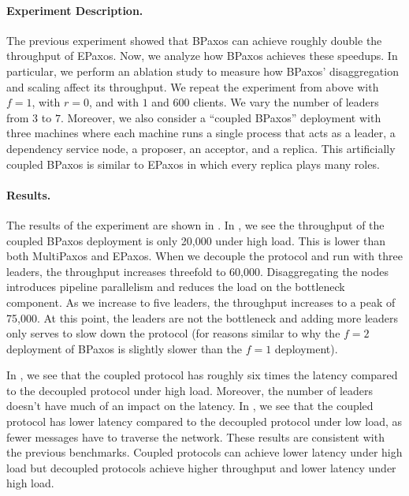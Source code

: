 \paragraph{Experiment Description.}
The previous experiment showed that BPaxos can achieve roughly double the
throughput of EPaxos. Now, we analyze how BPaxos achieves these speedups. In
particular, we perform an ablation study to measure how BPaxos' disaggregation
and scaling affect its throughput. We repeat the experiment from above with
$f=1$, with $r=0$, and with $1$ and $600$ clients. We vary the number of
leaders from $3$ to $7$. Moreover, we also consider a ``coupled BPaxos''
deployment with three machines where each machine runs a single process that
acts as a leader, a dependency service node, a proposer, an acceptor, and a
replica. This artificially coupled BPaxos is similar to EPaxos in which every
replica plays many roles.


\paragraph{Results.}
The results of the experiment are shown in . In
, we see the throughput of the coupled
BPaxos deployment is only 20,000 under high load. This is lower than both
MultiPaxos and EPaxos. When we decouple the protocol and run with three
leaders, the throughput increases threefold to 60,000. Disaggregating the nodes
introduces pipeline parallelism and reduces the load on the bottleneck
component. As we increase to five leaders, the throughput increases to a peak
of 75,000. At this point, the leaders are not the bottleneck and adding more
leaders only serves to slow down the protocol (for reasons similar to why the
$f=2$ deployment of BPaxos is slightly slower than the $f=1$ deployment).

In , we see that the coupled protocol has
roughly six times the latency compared to the decoupled protocol under high
load. Moreover, the number of leaders doesn't have much of an impact on the
latency. In , we see that the coupled
protocol has lower latency compared to the decoupled protocol under low load,
as fewer messages have to traverse the network. These results are consistent
with the previous benchmarks. Coupled protocols can achieve lower latency under
high load but decoupled protocols achieve higher throughput and lower latency
under high load.

